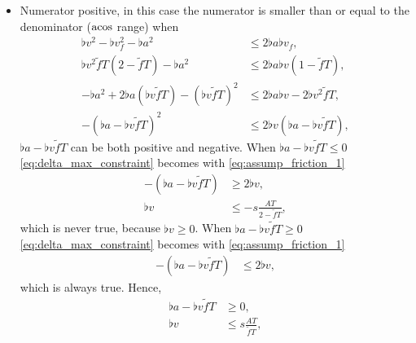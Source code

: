 \begin{itemize}
\item
Numerator positive, in this case the numerator is smaller than or equal to the denominator ($\operatorname{acos}$ range) when
\begin{align}
\nonumber
\flat{v}^2 - \flat{v}_f^2 - \flat{a}^2 &\le 2 \flat{a} \flat{v}_f,\\
\nonumber
\flat{v}^2 \tilde{f}T (2 - \tilde{f}T) - \flat{a}^2 &\le 2 \flat{a} \flat{v} (1 - \tilde{f}T),\\
\nonumber
- \flat{a}^2 + 2 \flat{a} (\flat{v} \tilde{f}T) - (\flat{v} \tilde{f}T)^2 &\le 2 \flat{a} \flat{v} - 2 \flat{v}^2 \tilde{f}T,\\
\label{eq:delta_max_constraint}
-(\flat{a} - \flat{v} \tilde{f}T)^2 &\le 2 \flat{v} (\flat{a} - \flat{v} \tilde{f}T),
\end{align}
$\flat{a} - \flat{v} \tilde{f}T$ can be both positive and negative. When $\flat{a} - \flat{v} \tilde{f}T \le 0$ \eqref{eq:delta_max_constraint} becomes with \eqref{eq:assump_friction_1}
\begin{align*}
-(\flat{a} - \flat{v} \tilde{f}T) &\ge 2 \flat{v},\\
\flat{v} &\le -s \frac{AT}{2 - \tilde{f}T},
\end{align*}
which is never true, because $\flat{v} \ge 0$. When $\flat{a} - \flat{v} \tilde{f}T \ge 0$ \eqref{eq:delta_max_constraint} becomes with \eqref{eq:assump_friction_1}
\begin{align*}
-(\flat{a} - \flat{v} \tilde{f}T) &\le 2 \flat{v},
\end{align*}
which is always true. Hence,
\begin{align*}
\flat{a} - \flat{v} \tilde{f}T &\ge 0,\\
\flat{v} &\le s \frac{AT}{\tilde{f}T},
\end{align*}
\end{itemize}

